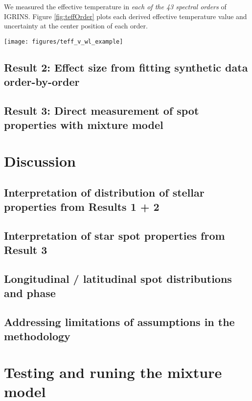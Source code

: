 \documentclass[onecolumn]{emulateapj}%
\begin{document}
We measured the effective temperature in \emph{each of the 43 spectral orders} of IGRINS.  Figure \ref{fig:teffOrder} plots each derived effective temperature value and uncertainty at the center position of each order.

\begin{figure*}
	\centering
	\texttt{[image: figures/teff\_v\_wl\_example]} 
	\caption{Effective temperature as derived by different orders.}
	\label{fig:teffOrder}
\end{figure*}

\subsection{Result 2: Effect size from fitting synthetic data order-by-order}

\subsection{Result 3: Direct measurement of spot properties with mixture model}

\section{Discussion}

\subsection{Interpretation of distribution of stellar properties from Results 1 + 2}

\subsection{Interpretation of star spot properties from Result 3}

\subsection{Longitudinal / latitudinal spot distributions and phase}

\subsection{Addressing limitations of assumptions in the methodology}



\appendix

\section{Testing and runing the mixture model}
\end{document}

